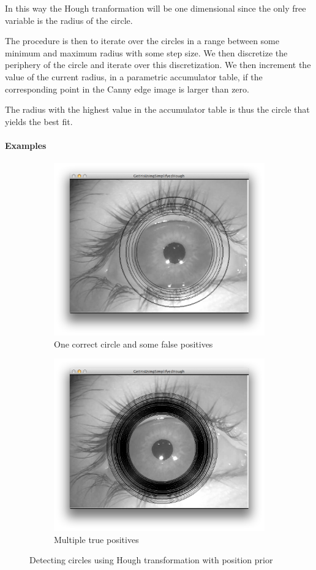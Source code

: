 \documentclass[a4paper,11pt]{article}
\begin{document}
In this way the Hough tranformation will be one dimensional since the only free variable is the radius of the circle.

The procedure is then to iterate over the circles in a range between some minimum and maximum radius with some step size. We then discretize the periphery of the circle and iterate over this discretization. We then increment the value of the current radius, in a parametric accumulator table, if the corresponding point in the Canny edge image is larger than zero.

The radius with the highest value in the accumulator table is thus the circle that yields the best fit.

\paragraph{Examples}
\label{par:examples}
\begin{figure}[H]
\centering
\begin{subfigure}{.48\textwidth}
  \centering
  \includegraphics[width=.8\linewidth]{circhoughavg}
  \caption{One correct circle and some false positives}
  \label{fig:circhoughavg}
\end{subfigure}
\begin{subfigure}{.48\textwidth}
  \centering
  \includegraphics[width=.8\linewidth]{circhoughgood}
  \caption{Multiple true positives}
  \label{fig:circhoughgood}
\end{subfigure}
\caption{Detecting circles using Hough transformation with position prior }
\label{fig:houghcircles}
\end{figure}
\end{document}
